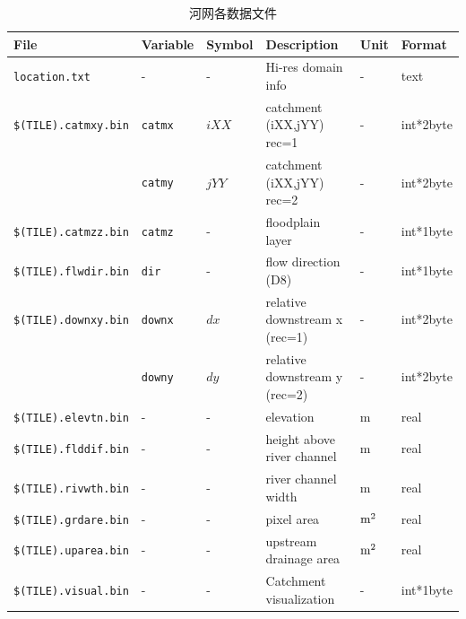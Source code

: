 \begin{table}[]
    \centering
    \caption{河网各数据文件}
    \label{tab:河网各数据文件}
    \begin{tabular}[h]{p{4cm}p{1.5cm}p{1.5cm}p{4cm}p{1cm}p{2cm}} %
    \toprule
    File                & Variable    & Symbol                        & Description                   & Unit      & Format \\ \midrule
    \texttt{location.txt}        & -        & -                             & Hi-res domain info            & -         & text   \\
    \texttt{\$(TILE).catmxy.bin} & \texttt{catmx}    & $iXX$         & catchment (iXX,jYY) rec=1     & - & int*2byte       \\
                                               & \texttt{catmy}    & $jYY$      & catchment (iXX,jYY) rec=2     & - & int*2byte      \\
    \texttt{\$(TILE).catmzz.bin} & \texttt{catmz}    & -                 & floodplain layer              & -  & int*1byte \\
    \texttt{\$(TILE).flwdir.bin} & \texttt{dir}      & -                        & flow direction (D8)         & -   & int*1byte  \\
    \texttt{\$(TILE).downxy.bin} & \texttt{downx}    & $dx$          & relative downstream x (rec=1) & - & int*2byte   \\
                                                & \texttt{downy}    & $dy$       & relative downstream y (rec=2) & - & int*2byte   \\
    \texttt{\$(TILE).elevtn.bin}    & -        & -                             & elevation                     & m                             & real    \\
    \texttt{\$(TILE).flddif.bin}      & -        & -                             & height above river channel    & m                             & real   \\
    \texttt{\$(TILE).rivwth.bin} & -        & -                                & river channel width           & m                             & real   \\
    \texttt{\$(TILE).grdare.bin} & -        & -                               & pixel area                    & $\rm m^2$                            & real   \\
    \texttt{\$(TILE).uparea.bin} & -       & -                               & upstream drainage area        & $\rm m^2$       & real   \\
    \texttt{\$(TILE).visual.bin}  & -        & -                               & Catchment visualization        & -                                                        & int*1byte       \\ \bottomrule
    \end{tabular}
\end{table}


